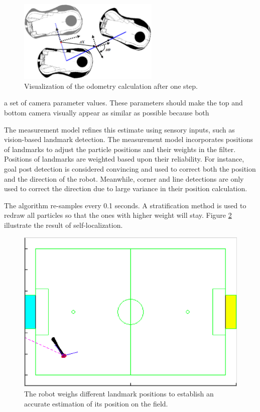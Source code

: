 \documentclass{article}
\begin{document}
	\begin{figure}[H]
		\centering
		\includegraphics[width=0.6\textwidth]{figures/Odometry.eps}
		\caption{Visualization of the odometry calculation after one step.}
		\label{fig:odometry}
	\end{figure}a set of camera parameter values. These parameters should make the top and bottom camera visually appear as similar as possible because both

	The measurement model refines this estimate using sensory inputs, such as vision-based landmark detection.  The measurement model incorporates positions of landmarks to adjust the particle positions and their weights in the filter. Positions of landmarks are weighted based upon their reliability. For instance, goal post detection is considered convincing and used to correct both the position and the direction of the robot. Meanwhile, corner and line detections are only used to correct the direction due to large variance in their position calculation.

	The algorithm re-samples every 0.1 seconds. A stratification method is used to redraw all  particles so that the ones with higher weight will stay. Figure \ref{fig:particlesafter} illustrate the result of self-localization.

	\begin{figure}[H]
		\centering
		\includegraphics[width=.6\textwidth]{figures/FocusedParticles.eps}
	  	\caption{The robot weighs different landmark positions to establish an accurate estimation of its position on the field.}
		\label{fig:particlesafter}
  	\end{figure}
\end{document}
